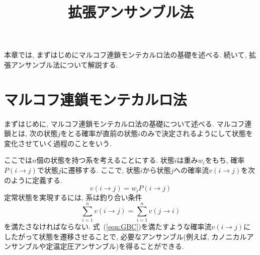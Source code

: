 





\title{拡張アンサンブル法}
\maketitle

本章では, まずはじめにマルコフ連鎖モンテカルロ法の基礎を述べる.
続いて, 拡張アンサンブル法について解説する.

\section{\label{sec:level2-1}マルコフ連鎖モンテカルロ法}
まずはじめに, マルコフ連鎖モンテカルロ法の基礎について述べる.
マルコフ連鎖とは, 次の状態$j$をとる確率が直前の状態$i$のみで決定されるようにして状態を変化させていく過程のことをいう.

ここでは$n$個の状態を持つ系を考えることにする. 状態$i$は重み$w_{i}$をもち, 確率$P(i \to j)$で状態$j$に遷移する.
ここで, 状態$i$から状態$j$への確率流$v(i \to j)$を次のように定義する.
\begin{equation}
 v(i \to j) = w_{i} P( i \to j )
 \label{eqn:def_nu}
\end{equation}
定常状態を実現するには, 系は釣り合い条件
\begin{equation}
 \sum_{i=1}^{n} v(i \to j) = \sum_{i=1}^{n} v(j \to i)
 \label{eqn:GBC}
\end{equation}
を満たさなければならない.
式~(\ref{eqn:GBC})を満たすような確率流$v(i \to j)$にしたがって状態を遷移させることで, 必要なアンサンブル(例えば, カノニカルアンサンブルや定温定圧アンサンブル)を得ることができる.

